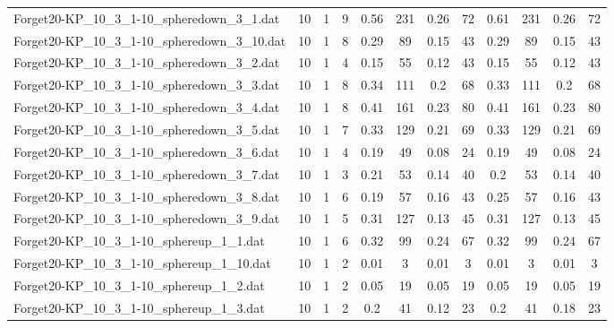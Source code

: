 \begin{sidewaystable}[!ht]
{\begin{tabular}{lccccccccccc}
Forget20-KP\_10\_3\_1-10\_spheredown\_3\_1.dat & 10 & 1 & 9 & 0.56 & 231 &  \textcolor{blue2}{0.26} & 72 & 0.61 & 231 &  \textcolor{blue2}{0.26} & 72 \\
Forget20-KP\_10\_3\_1-10\_spheredown\_3\_10.dat & 10 & 1 & 8 & 0.29 & 89 &  \textcolor{blue2}{0.15} & 43 & 0.29 & 89 &  \textcolor{blue2}{0.15} & 43 \\
Forget20-KP\_10\_3\_1-10\_spheredown\_3\_2.dat & 10 & 1 & 4 & 0.15 & 55 &  \textcolor{blue2}{0.12} & 43 & 0.15 & 55 &  \textcolor{blue2}{0.12} & 43 \\
Forget20-KP\_10\_3\_1-10\_spheredown\_3\_3.dat & 10 & 1 & 8 & 0.34 & 111 & 0.2 & 68 & 0.33 & 111 & 0.2 & 68 \\
Forget20-KP\_10\_3\_1-10\_spheredown\_3\_4.dat & 10 & 1 & 8 & 0.41 & 161 & 0.23 & 80 & 0.41 & 161 & 0.23 & 80 \\
Forget20-KP\_10\_3\_1-10\_spheredown\_3\_5.dat & 10 & 1 & 7 & 0.33 & 129 &  \textcolor{blue2}{0.21} & 69 & 0.33 & 129 &  \textcolor{blue2}{0.21} & 69 \\
Forget20-KP\_10\_3\_1-10\_spheredown\_3\_6.dat & 10 & 1 & 4 & 0.19 & 49 &  \textcolor{blue2}{0.08} & 24 & 0.19 & 49 &  \textcolor{blue2}{0.08} & 24 \\
Forget20-KP\_10\_3\_1-10\_spheredown\_3\_7.dat & 10 & 1 & 3 & 0.21 & 53 &  \textcolor{blue2}{0.14} & 40 & 0.2 & 53 &  \textcolor{blue2}{0.14} & 40 \\
Forget20-KP\_10\_3\_1-10\_spheredown\_3\_8.dat & 10 & 1 & 6 & 0.19 & 57 &  \textcolor{blue2}{0.16} & 43 & 0.25 & 57 &  \textcolor{blue2}{0.16} & 43 \\
Forget20-KP\_10\_3\_1-10\_spheredown\_3\_9.dat & 10 & 1 & 5 & 0.31 & 127 &  \textcolor{blue2}{0.13} & 45 & 0.31 & 127 &  \textcolor{blue2}{0.13} & 45 \\
Forget20-KP\_10\_3\_1-10\_sphereup\_1\_1.dat & 10 & 1 & 6 & 0.32 & 99 &  \textcolor{blue2}{0.24} & 67 & 0.32 & 99 &  \textcolor{blue2}{0.24} & 67 \\
Forget20-KP\_10\_3\_1-10\_sphereup\_1\_10.dat & 10 & 1 & 2 &  \textcolor{blue2}{0.01} & 3 &  \textcolor{blue2}{0.01} & 3 &  \textcolor{blue2}{0.01} & 3 &  \textcolor{blue2}{0.01} & 3 \\
Forget20-KP\_10\_3\_1-10\_sphereup\_1\_2.dat & 10 & 1 & 2 &  \textcolor{blue2}{0.05} & 19 &  \textcolor{blue2}{0.05} & 19 &  \textcolor{blue2}{0.05} & 19 &  \textcolor{blue2}{0.05} & 19 \\
Forget20-KP\_10\_3\_1-10\_sphereup\_1\_3.dat & 10 & 1 & 2 & 0.2 & 41 &  \textcolor{blue2}{0.12} & 23 & 0.2 & 41 & 0.18 & 23 \\

\end{tabular}}
\end{sidewaystable}

